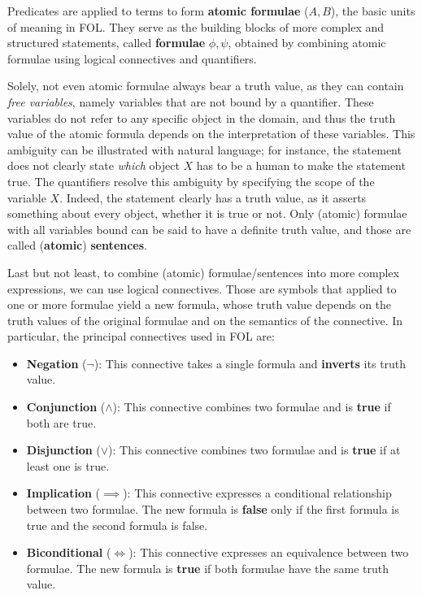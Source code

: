 Predicates are applied to terms to form \textbf{atomic formulae} (\(A,B\)), the basic units of meaning in FOL\@. They serve as the building blocks of more complex and structured statements, called \textbf{formulae} \(\phi, \psi\), obtained by combining atomic formulae using logical connectives and quantifiers.

Solely, not even atomic formulae always bear a truth value, as they can contain \textit{free variables}, namely variables that are not bound by a quantifier. These variables do not refer to any specific object in the domain, and thus the truth value of the atomic formula depends on the interpretation of these variables.
This ambiguity can be illustrated with natural language; for instance, the statement  does not clearly state \textit{which} object \(X\) has to be a human to make the statement true.
The quantifiers resolve this ambiguity by specifying the scope of the variable \(X\). Indeed, the statement  clearly has a truth value, as it asserts something about every object, whether it is true or not.
Only (atomic) formulae with all variables bound can be said to have a definite truth value, and those are called (\textbf{atomic}) \textbf{sentences}.

Last but not least, to combine (atomic) formulae/sentences into more complex expressions, we can use logical connectives. Those are symbols that applied to one or more formulae yield a new formula, whose truth value depends on the truth values of the original formulae and on the semantics of the connective.
In particular, the principal connectives used in FOL are:

\begin{itemize}
  \item \textbf{Negation} (\(\neg\)): This connective takes a single formula and \textbf{inverts} its truth value.
  \item \textbf{Conjunction} (\(\land\)): This connective combines two formulae and is \textbf{true} if both are true.
  \item \textbf{Disjunction} (\(\lor\)): This connective combines two formulae and is \textbf{true} if at least one is true.
  \item \textbf{Implication} (\(\implies\)): This connective expresses a conditional relationship between two formulae. The new formula is \textbf{false} only if the first formula is true and the second formula is false.
  \item \textbf{Biconditional} (\(\iff\)): This connective expresses an equivalence between two formulae. The new formula is \textbf{true} if both formulae have the same truth value.
\end{itemize}

